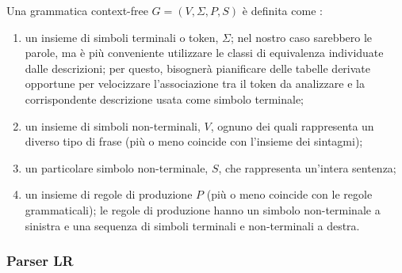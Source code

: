 \documentclass[twoside,stylearticle,11pt,filologia,it,article,bibsection]{spinoza}
\begin{document}
Una grammatica context-free $G=(V,\Sigma,P,S)$ è definita come
:
\begin{enumerate}
\item un insieme di simboli terminali o token, $\Sigma$; nel nostro
  caso sarebbero le parole, ma è più conveniente utilizzare le classi
  di equivalenza individuate dalle descrizioni; per questo, bisognerà
  pianificare delle tabelle derivate opportune per velocizzare
  l'associazione tra il token da analizzare e la corrispondente
  descrizione usata come simbolo terminale;
\item un insieme di simboli non-terminali, $V$, ognuno dei quali
  rappresenta un diverso tipo di frase (più o meno coincide con
  l'insieme dei sintagmi);
\item un particolare simbolo non-terminale, $S$, che rappresenta
  un'intera sentenza;
\item un insieme di regole di produzione $P$ (più o meno coincide con
  le regole grammaticali); le regole di produzione hanno un simbolo
  non-terminale a sinistra e una sequenza di simboli terminali e
  non-terminali a destra.
\end{enumerate}

\subsubsection{Parser LR}
\end{document}
